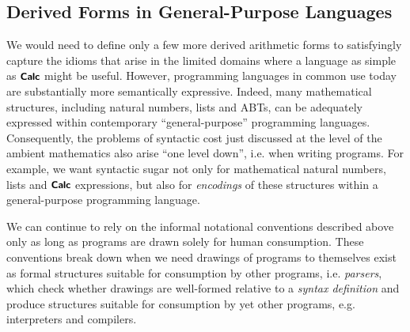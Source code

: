 \subsection{Derived Forms in General-Purpose Languages}
We would need to define only a few more derived arithmetic forms to satisfyingly capture the  idioms that arise in the limited domains where a language as simple as $\textsf{\textbf{\small Calc}}$ might be useful. %
However, programming languages in common use today are substantially more semantically expressive. Indeed, many mathematical structures, including natural numbers, lists and ABTs, can be adequately expressed within contemporary ``general-purpose'' programming languages. %
Consequently, the problems of syntactic cost just discussed at the level of the ambient mathematics also arise ``one level down'', i.e. when writing programs. For example, we want syntactic sugar not only for mathematical natural numbers, lists and $\textsf{\textbf{\small Calc}}$ expressions, but also for \emph{encodings} of these structures within a general-purpose programming language.%

We can continue to rely on the informal notational conventions described above only as long as programs are drawn solely for human consumption. These conventions break down when we need drawings of programs to themselves exist as formal structures suitable for consumption by other programs, i.e. \emph{parsers}, which check whether drawings are well-formed relative to a \emph{syntax definition} and produce structures suitable for consumption by yet other programs, e.g. interpreters and compilers. %




